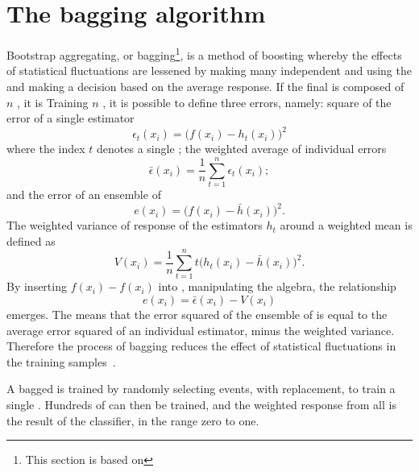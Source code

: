 \section{The bagging algorithm}
\label{sec:bdt:bag}
Bootstrap aggregating, or bagging\footnote{
  This section is based on }, is a method of boosting whereby the effects of
statistical fluctuations are lessened by making many independent \DTs and using the
and making a decision based on the average response.
If the final \BDT is composed of $n$ \DTs, it is
Training $n$ \DTs, it is possible to define three errors, namely:
square of the error of a single estimator
\begin{equation}
  \epsilon_t(x_i) = \big(f(x_i)-h_t(x_i)\big)^2
  \label{eq:bdt:bag1}
\end{equation}
where the index $t$ denotes a single \DT;
the weighted average of individual errors
\begin{equation}
  \bar\epsilon(x_i) = \frac1n\sum_{t=1}^n\epsilon_t(x_i);
  \label{eq:bdt:bag2}
\end{equation}
and the error of an ensemble of \DTs
\begin{equation}
  e(x_i) = \big(f(x_i)-\bar h(x_i)\big)^2.
  \label{eq:bdt:bag3}
\end{equation}
The weighted variance of response of the estimators $h_t$ around a weighted mean is defined as
\begin{equation}
  V(x_i) = \frac1n\sum_{t=1}^nt\big(h_t(x_i) - \bar h(x_i)\big)^2.
  \label{eq:bdt:bag4}
\end{equation}
By inserting $f(x_i)-f(x_i)$ into , manipulating the algebra, the relationship
\begin{equation}
  e(x_i) = \bar\epsilon(x_i) - V(x_i)
  \label{eq:bdt:bag5}
\end{equation}
emerges.
The means that the error squared of the ensemble of \DTs is equal to the average error squared of an
individual estimator, minus the weighted variance.
Therefore the process of bagging reduces the
effect of statistical fluctuations in the training samples~\cite{Krogh95neuralnetwork}.

A bagged \BDT is trained by randomly selecting events, with replacement, to train a single \DT.
Hundreds of \DTs can then be trained, and the weighted response from all \DTs is the result of the
classifier, in the range zero to one.





